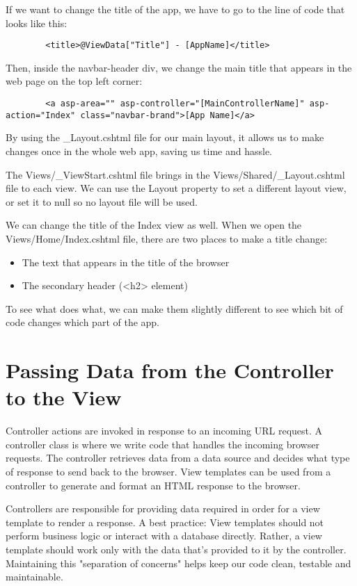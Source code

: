 \documentclass{report}
\begin{document}
    If we want to change the title of the app, we have to go to the line of code that looks like this:

    \lstset{style=sharpc}
    \begin{lstlisting}
        <title>@ViewData["Title"] - [AppName]</title>
    \end{lstlisting}

    Then, inside the navbar-header div, we change the main title that appears in the
    web page on the top left corner:
    \lstset{style=sharpc}
    \begin{lstlisting}
        <a asp-area="" asp-controller="[MainControllerName]" asp-action="Index" class="navbar-brand">[App Name]</a>
    \end{lstlisting}

    By using the _Layout.cshtml file for our main layout, it allows us to make changes
    once in the whole web app, saving us time and hassle.

    The Views/_ViewStart.cshtml file brings in the Views/Shared/_Layout.cshtml
    file to each view. We can use the Layout property to set a different layout
    view, or set it to null so no layout file will be used.

    We can change the title of the Index view as well.
    When we open the Views/Home/Index.cshtml file, there are two places
    to make a title change:
    \begin{itemize}
        \item The text that appears in the title of the browser
        \item The secondary header (<h2> element)
    \end{itemize}

    To see what does what, we can make them slightly different
    to see which bit of code changes which part of the app.

    \section{Passing Data from the Controller to the View}
    Controller actions are invoked in response to an incoming URL
    request. A controller class is where we write code that handles
    the incoming browser requests. The controller retrieves data from
    a data source and decides what type of response to send back to
    the browser. View templates can be used from a controller to generate
    and format an HTML response to the browser.

    Controllers are responsible for providing data required in order for a
    view template to render a response. A best practice: View templates
    should not perform business logic or interact with a database directly.
    Rather, a view template should work only with the data that's provided
    to it by the controller. Maintaining this "separation of concerns" helps
    keep our code clean, testable and maintainable.
\end{document}
